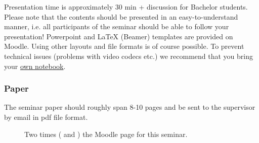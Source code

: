 \documentclass[
12pt,
headsepline,
bibliography=totoc,
twoside=semi,
fleqn
]{scrartcl}
\begin{document}
Presentation time is approximately 30 min + discussion for Bachelor students. Please note that the contents should be presented in an easy-to-understand manner, i.e. all participants of the seminar should be able to follow your presentation! Powerpoint and LaTeX (Beamer) templates are provided on Moodle. Using other layouts and file formats is of course possible. To prevent technical issues (problems with video codecs etc.) we recommend that you bring your \underline{own notebook}.

\subsubsection{Paper} 

The seminar paper should roughly span 8-10 pages and be sent to the supervisor by email in pdf file format.



\begin{figure}[p]
\centering
{}
\caption{Two times ( and ) the Moodle page for this seminar.}
\label{fig:subfigureExample}
\end{figure}

\end{document}
